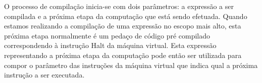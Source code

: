 O processo de compilação inicia-se com dois parâmetros: a expressão a ser compilada e a próxima etapa da computação que está sendo efetuada. Quando estamos realizando a compilação de uma expressão no escopo mais alto, esta próxima etapa normalmente é um pedaço de código pré compilado correspondendo à instrução Halt da máquina virtual. Esta expressão representando a próxima etapa da computação pode então ser utilizada para compor o parâmetro das instruções da máquina virtual que indica qual a próxima instrução a ser executada.





